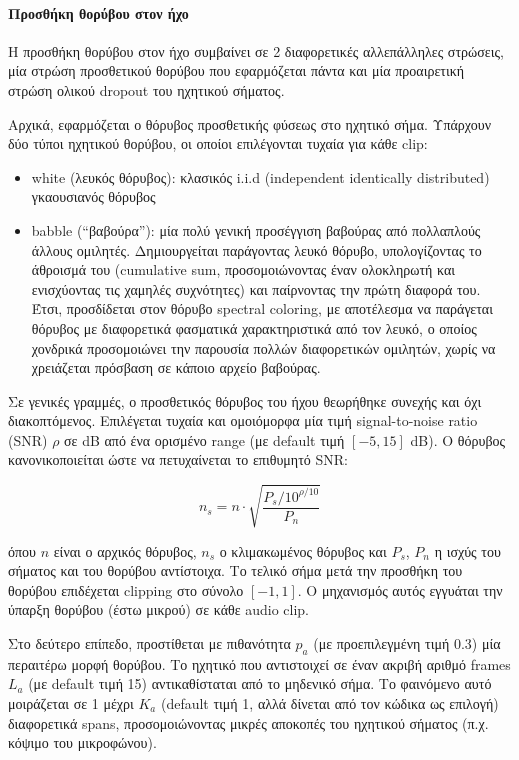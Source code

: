 \paragraph{Προσθήκη θορύβου στον ήχο}

 Η προσθήκη θορύβου στον ήχο συμβαίνει σε 2 διαφορετικές αλλεπάλληλες στρώσεις, μία στρώση προσθετικού θορύβου που εφαρμόζεται πάντα και μία προαιρετική στρώση ολικού dropout του ηχητικού σήματος.
 
 Αρχικά, εφαρμόζεται ο θόρυβος προσθετικής φύσεως στο ηχητικό σήμα. Υπάρχουν δύο τύποι ηχητικού θορύβου, οι οποίοι επιλέγονται τυχαία για κάθε clip:
 
 \begin{itemize}
 \item white (λευκός θόρυβος): κλασικός i.i.d (independent identically distributed) γκαουσιανός θόρυβος
 
 \item babble (``βαβούρα''): μία πολύ γενική προσέγγιση βαβούρας από πολλαπλούς άλλους ομιλητές. Δημιουργείται παράγοντας λευκό θόρυβο, υπολογίζοντας το άθροισμά του (cumulative sum, προσομοιώνοντας έναν ολοκληρωτή και ενισχύοντας τις χαμηλές συχνότητες) και παίρνοντας την πρώτη διαφορά του. Έτσι, προσδίδεται στον θόρυβο spectral coloring, με αποτέλεσμα να παράγεται θόρυβος με διαφορετικά φασματικά χαρακτηριστικά από τον λευκό, ο οποίος χονδρικά προσομοιώνει την παρουσία πολλών διαφορετικών ομιλητών, χωρίς να χρειάζεται πρόσβαση σε κάποιο αρχείο βαβούρας.
 \end{itemize}
 
 Σε γενικές γραμμές, ο προσθετικός θόρυβος του ήχου θεωρήθηκε συνεχής και όχι διακοπτόμενος. Επιλέγεται τυχαία και ομοιόμορφα μία τιμή signal-to-noise ratio (SNR) $\rho$ σε dB από ένα ορισμένο range (με default τιμή $[-5,15]$ dB). Ο θόρυβος κανονικοποιείται ώστε να πετυχαίνεται το επιθυμητό SNR:
 
 \[
 n_s = n \cdot \sqrt{\frac{P_s/10^{\rho/10}}{P_n}}
 \]
 
 όπου $n$ είναι ο αρχικός θόρυβος, $n_s$ ο κλιμακωμένος θόρυβος και $P_s$, $P_n$ η ισχύς του σήματος και του θορύβου αντίστοιχα. Το τελικό σήμα μετά την προσθήκη του θορύβου επιδέχεται clipping στο σύνολο $[-1,1]$. Ο μηχανισμός αυτός εγγυάται την ύπαρξη θορύβου (έστω μικρού) σε κάθε audio clip.
 
 Στο δεύτερο επίπεδο, προστίθεται με πιθανότητα $p_a$ (με προεπιλεγμένη τιμή 0.3) μία περαιτέρω μορφή θορύβου. Το ηχητικό που αντιστοιχεί σε έναν ακριβή αριθμό frames $L_a$ (με default τιμή 15) αντικαθίσταται από το μηδενικό σήμα. Το φαινόμενο αυτό μοιράζεται σε 1 μέχρι $K_a$ (default τιμή 1, αλλά δίνεται από τον κώδικα ως επιλογή) διαφορετικά spans, προσομοιώνοντας μικρές αποκοπές του ηχητικού σήματος (π.χ. κόψιμο του μικροφώνου). 
 
